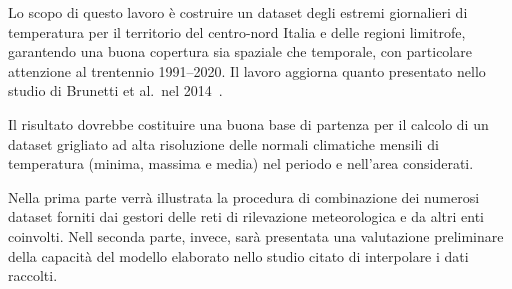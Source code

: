 Lo scopo di questo lavoro è costruire un dataset degli estremi giornalieri di temperatura per il territorio del centro-nord Italia e delle regioni limitrofe, garantendo una buona copertura sia spaziale che temporale, con particolare attenzione al trentennio 1991--2020. Il lavoro aggiorna quanto presentato nello studio di Brunetti et al.\ nel 2014~\cite{brunettiHighresolutionTemperatureClimatology2014}.

Il risultato dovrebbe costituire una buona base di partenza per il calcolo di un dataset grigliato ad alta risoluzione delle normali climatiche mensili di temperatura (minima, massima e media) nel periodo e nell'area considerati.

Nella prima parte verrà illustrata la procedura di combinazione dei numerosi dataset forniti dai gestori delle reti di rilevazione meteorologica e da altri enti coinvolti. Nell seconda parte, invece, sarà presentata una valutazione preliminare della capacità del modello elaborato nello studio citato di interpolare i dati raccolti.